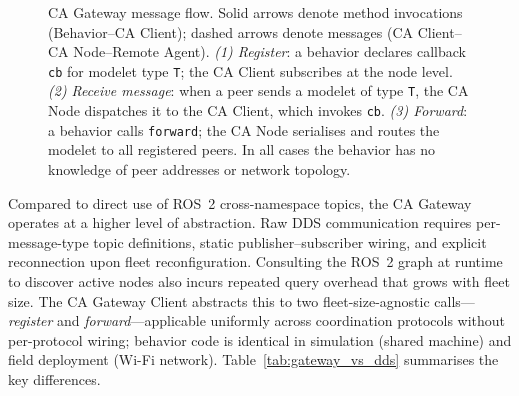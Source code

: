 \documentclass[deliverable]{csreport}
\begin{document}
\begin{figure}[tbh]
\caption{CA Gateway message flow. Solid arrows denote method invocations (Behavior--CA Client); dashed arrows denote messages (CA Client--CA Node--Remote Agent). \textit{(1) Register}: a behavior declares callback \texttt{cb} for modelet type \texttt{T}; the CA Client subscribes at the node level. \textit{(2) Receive message}: when a peer sends a modelet of type \texttt{T}, the CA Node dispatches it to the CA Client, which invokes \texttt{cb}. \textit{(3) Forward}: a behavior calls \texttt{forward}; the CA Node serialises and routes the modelet to all registered peers. In all cases the behavior has no knowledge of peer addresses or network topology.}
\label{fig:gateway}
\end{figure}

Compared to direct use of ROS~2 cross-namespace topics, the CA Gateway operates at a higher level of abstraction. Raw DDS communication requires per-message-type topic definitions, static publisher--subscriber wiring, and explicit reconnection upon fleet reconfiguration. Consulting the ROS~2 graph at runtime to discover active nodes also incurs repeated query overhead that grows with fleet size. The CA Gateway Client abstracts this to two fleet-size-agnostic calls---\textit{register} and \textit{forward}---applicable uniformly across coordination protocols without per-protocol wiring; behavior code is identical in simulation (shared machine) and field deployment (Wi-Fi network). Table~\ref{tab:gateway_vs_dds} summarises the key differences.
\end{document}

